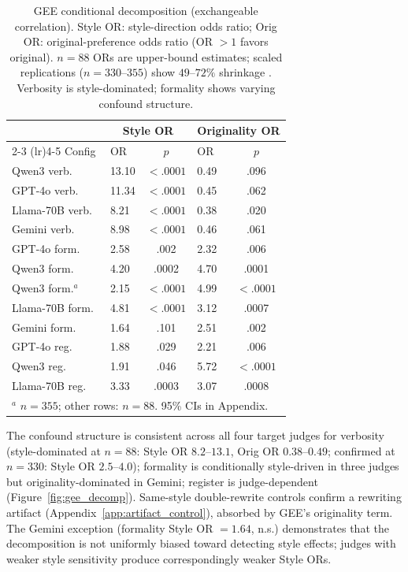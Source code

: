 \begin{table}[t]
\centering
\small
\caption{GEE conditional decomposition (exchangeable correlation). Style OR: style-direction odds ratio; Orig OR: original-preference odds ratio (OR $> 1$ favors original). $n{=}88$ ORs are upper-bound estimates; scaled replications ($n = 330$--$355$) show $49$--$72\%$ shrinkage \citep{nemes2009bias}. Verbosity is style-dominated; formality shows varying confound structure.}
\label{tab:gee}
\begin{tabular}{@{}llclc@{}}
\toprule
 & \multicolumn{2}{c}{Style OR} & \multicolumn{2}{c}{Originality OR} \\
\cmidrule(lr){2-3} \cmidrule(lr){4-5}
Config & OR & $p$ & OR & $p$ \\
\midrule
Qwen3 verb.\ & 13.10 & ${<}.0001$ & 0.49 & .096 \\
GPT-4o verb.\ & 11.34 & ${<}.0001$ & 0.45 & .062 \\
Llama-70B verb.\ & 8.21 & ${<}.0001$ & 0.38 & .020 \\
Gemini verb.\ & 8.98 & ${<}.0001$ & 0.46 & .061 \\
\midrule
GPT-4o form.\ & 2.58 & .002 & 2.32 & .006 \\
Qwen3 form.\ & 4.20 & .0002 & 4.70 & .0001 \\
Qwen3 form.$^a$ & 2.15 & ${<}.0001$ & 4.99 & ${<}.0001$ \\
Llama-70B form.\ & 4.81 & ${<}.0001$ & 3.12 & .0007 \\
Gemini form.\ & 1.64 & .101 & 2.51 & .002 \\
\midrule
GPT-4o reg.\ & 1.88 & .029 & 2.21 & .006 \\
Qwen3 reg.\ & 1.91 & .046 & 5.72 & ${<}.0001$ \\
Llama-70B reg.\ & 3.33 & .0003 & 3.07 & .0008 \\
\bottomrule
\multicolumn{5}{l}{\footnotesize $^a$ $n = 355$; other rows: $n = 88$. 95\% CIs in Appendix.}
\end{tabular}
\end{table}

The confound structure is consistent across all four target judges for verbosity (style-dominated at $n = 88$: Style OR $8.2$--$13.1$, Orig OR $0.38$--$0.49$; confirmed at $n = 330$: Style OR $2.5$--$4.0$); formality is conditionally style-driven in three judges but originality-dominated in Gemini; register is judge-dependent (Figure~\ref{fig:gee_decomp}).
Same-style double-rewrite controls confirm a rewriting artifact (Appendix~\ref{app:artifact_control}), absorbed by GEE's originality term.
The Gemini exception (formality Style OR $= 1.64$, n.s.) demonstrates that the decomposition is not uniformly biased toward detecting style effects; judges with weaker style sensitivity produce correspondingly weaker Style ORs.

